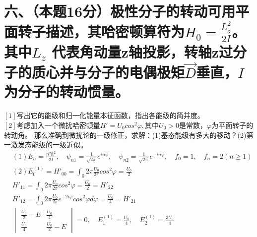 \documentclass[UTF8]{ctexart}
\begin{document}
\section*{六、（本题16分）极性分子的转动可用平面转子描述，其哈密顿算符为$H_0=\frac{L_z^2}{2I}$。其中$L_z$
  代表角动量z轴投影，转轴z过分子的质心并与分子的电偶极矩$\vec D$垂直，$I$为分子的转动惯量。}
$[1]$写出它的能级和归一化能量本征函数，指出各能级的简并度。\\
$[2]$考虑加入一个微扰哈密顿量$H'=U_0 cos^2\varphi,$其中$U_0>0$是常数，$\varphi$为平面转子的转动角。
那么准确到微扰论的一级修正，求解：(1)基态能级有多大的移动？(2)第一激发态能级的一级近似。
\begin{equation*}
  \begin{aligned}
     & (1)E_n=\frac{n^2\hbar^2}{2I},\quad\psi_{n1}=\frac{1}{\sqrt{2\pi}}e^{i n\varphi},\quad
    \psi_{n2}=\frac{1}{\sqrt{2\pi}}e^{-i n\varphi},\quad f_0=1,\quad f_n=2(n\geq1)                       \\
     & (2)E_0^{(1)}={H'}_{00}=\int_0{2\pi}\frac{U_0}{2\pi}cos^2\varphi=\frac{U_0}{2}                     \\
     & {H'}_{11}=\int_0{2\pi}\frac{U_0}{2\pi}cos^2\varphi=\frac{U_0}{2}={H'}_{22}                        \\
     & {H'}_{12}=\int_0{2\pi}\frac{U_0}{2\pi}e^{-2i\varphi}cos^2\varphi d\varphi=\frac{U_0}{4}={H'}_{21} \\
     & \begin{vmatrix}
      \frac{U_0}{2}-E & \frac{U_0}{4}   \\
      \frac{U_0}{4}   & \frac{U_0}{2}-E
    \end{vmatrix}=0,\quad E_1^{(1)}=\frac{U_0}{4},\quad E_2^{(1)}=\frac{3U_0}{4}
  \end{aligned}
\end{equation*}
\end{document}

